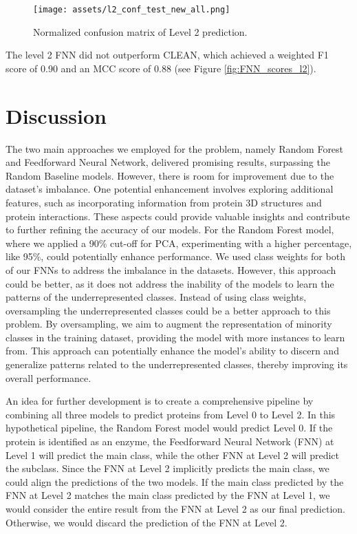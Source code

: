 \documentclass{bioinfo}
\begin{document}
\begin{figure}[!htb]
\texttt{[image: assets/l2\_conf\_test\_new\_all.png]}
\caption{Normalized confusion matrix of Level 2 prediction.}\label{fig:FNN_conf_l2}
\end{figure}

The level 2 FNN did not outperform CLEAN, which achieved a weighted F1 score of 0.90 and an MCC score of 0.88 (see Figure \ref{fig:FNN_scores_l2}).
\section{Discussion}
The two main approaches we employed for the problem, namely Random Forest and Feedforward Neural Network, delivered promising results, surpassing the Random Baseline models.
However, there is room for improvement due to the dataset's imbalance.
One potential enhancement involves exploring additional features, such as incorporating information from protein 3D structures and protein interactions.
These aspects could provide valuable insights and contribute to further refining the accuracy of our models.
For the Random Forest model, where we applied a 90\% cut-off for PCA, experimenting with a higher percentage, 
like 95\%, could potentially enhance performance.
We used class weights for both of our FNNs to address the imbalance in the datasets.
However, this approach could be better, as it does not address the inability of the models to learn the patterns of the underrepresented classes.
Instead of using class weights, oversampling the underrepresented classes could be a better approach to this problem.
By oversampling, we aim to augment the representation of minority classes in the training dataset, 
providing the model with more instances to learn from. 
This approach can potentially enhance the model's ability to discern and generalize patterns related to the underrepresented 
classes, thereby improving its overall performance.

An idea for further development is to create a comprehensive pipeline by combining all three models to predict proteins from Level 0 to Level 2.
In this hypothetical pipeline, the Random Forest model would predict Level 0.
If the protein is identified as an enzyme, the Feedforward Neural Network (FNN) at Level 1 will predict the main class,
while the other FNN at Level 2 will predict the subclass.
Since the FNN at Level 2 implicitly predicts the main class, we could align the predictions of the two models.
If the main class predicted by the FNN at Level 2 matches the main class predicted by the FNN at Level 1, 
we would consider the entire result from the FNN at Level 2 as our final prediction.
Otherwise, we would discard the prediction of the FNN at Level 2.\\
\end{document}
